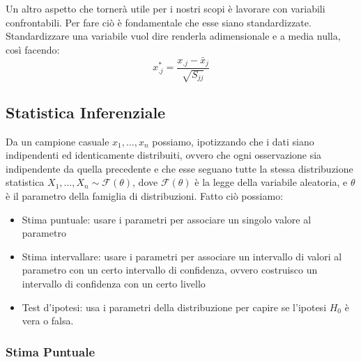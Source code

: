 \documentclass{article}
\begin{document}
        Un altro aspetto che tornerà utile per i nostri scopi è lavorare con variabili confrontabili. Per fare ciò è fondamentale che esse siano standardizzate. 
        Standardizzare una variabile vuol dire renderla adimensionale e a media nulla, così facendo:
        \begin{equation}
        x^*_{.j}=\frac{x_{.j} - \bar x_j}{{\sqrt{S_{jj}}}}
        \end{equation}
        \subsection{Statistica Inferenziale}
        Da un campione casuale $x_1, \dots, x_n$ possiamo, ipotizzando che i dati siano indipendenti ed identicamente distribuiti, ovvero che ogni osservazione sia indipendente da quella precedente e che esse seguano tutte la stessa distribuzione statistica $X_1, \dots, X_n \sim \mathcal F(\theta)$, dove $\mathcal F (\theta)$ è la legge della variabile aleatoria, e $\theta$ è il parametro della famiglia di distribuzioni.
        Fatto ciò possiamo: 
        \begin{itemize}
            \item Stima puntuale: usare i parametri per associare un singolo valore al parametro
            \item Stima intervallare: usare i parametri per associare un intervallo di valori al parametro con un certo intervallo di confidenza, ovvero costruisco un intervallo di confidenza con un certo livello
            \item Test d'ipotesi: usa i parametri della distribuzione per capire se l'ipotesi $H_0$ è vera o falsa. 
        \end{itemize}
        \subsubsection{Stima Puntuale}
\end{document}
